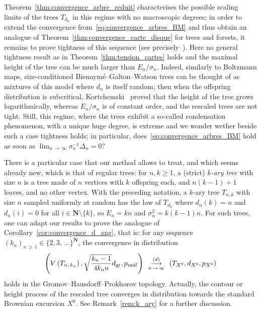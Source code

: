 \documentclass[10pt]{amsart}
\theoremstyle{definition}\newtheorem{defi}[theo]{Definition}\newtheorem{rema}[theo]{Remark}\newtheorem{exam}[theo]{Example}\newtheorem{exem}[theo]{Example}\newtheorem{nota}[theo]{Notation}
\newcommand{\ensembles}[1]{\mathbf{#1}}
\newcommand{\N}{\ensembles{N}}
\newcommand{\1}{\ensembles{1}}
\renewcommand{\ge}{\geqslant}
\newcommand{\CRT}{T}
\newcommand{\dCRT}{d}
\newcommand{\pCRT}{p}
\newcommand{\dgr}{d_{\mathrm{gr}}}
\newcommand{\pgr}{p_{\mathrm{unif}}}
\newcommand{\tn}{T_{d_n}}
\newcommand{\edges}{E}
\newcommand{\cvloi}[1][n]{\enskip\mathop{\longrightarrow}^{(d)}_{#1\,\to\, \infty}\enskip}
\providecommand{\?}{}
\begin{document}
Theorem~\ref{thm:convergence_arbre_reduit} characterises the possible scaling limits of the trees $\tn$ in this regime with no macroscopic degrees; in order to extend the convergence from~\eqref{eq:convergence_arbres_BM} and thus obtain an analogue of Theorem~\ref{thm:convergence_carte_disque} for trees and forests, it remains to prove tightness of this sequence (see precisely~\cite[Equation~25]{Ald93}). Here no general tightness result as in Theorem~\ref{thm:tension_cartes} holds and the maximal height of the tree can be much larger than $\edges_n / \sigma_n$. Indeed, similarly to Boltzmann maps, size-conditioned Bienaymé--Galton--Watson trees can be thought of as mixtures of this model where $d_n$ is itself random; then when the offspring distribution is subcritical, Kortchemski~\cite{Kor15} proved that the height of the tree grows logarithmically, whereas $\edges_n / \sigma_n$ is of constant order, and the rescaled trees are not tight. Still, this regime, where the trees exhibit a so-called condensation phenomenon, with a unique huge degree, is extreme and we wonder wether beside such a case tightness holds; in particular, does~\eqref{eq:convergence_arbres_BM} hold as soon as $\lim_{n\,\to\,\infty} \sigma_n^{-1} \Delta_n = 0$?

There is a particular case that our method allows to treat, and which seems already new, which is that of regular trees: for $n,k\ge1$, a (strict) \emph{$k$-ary tree} with size $n$ is a tree made of $n$ vertices with $k$ offspring each, and $n(k-1) + 1$ leaves, and no other vertex. With the preceding notation, a $k$-ary tree $T_{n,k}$ with size $n$ sampled uniformly at random has the law of $\tn$ where $d_{n}(k) = n$ and $d_{n}(i) = 0$ for all $i\in \N\setminus\{k\}$, so $\edges_n = k n$ and $\sigma_{n}^{2} = k(k-1)n$. For such trees, one can adapt our results to prove the analogue of Corollary~\ref{cor:convergence_d_ang}, that is: for any sequence $(k_{n})_{n\,\ge\,1} \in \{2, 3, \,\dots\}^\N$, the convergence in distribution
\begin{equation}\label{eq:arbres_k_aires}
\left(V\left(T_{n,\,k_{n}}\right), \sqrt{\frac{k_{n}-1}{4 k_{n} n}} \dgr, \pgr\right) \cvloi \left(\CRT_{X^0}, \dCRT_{X^0}, \pCRT_{X^0}\right)
\end{equation}
holds in the Gromov--Hausdorff--Prokhorov topology. Actually, the contour or height process of the rescaled tree converges in distribution towards the standard Brownian excursion $X^{0}$. See Remark~\ref{rem:k_ary} for a further discussion.
\end{document}
